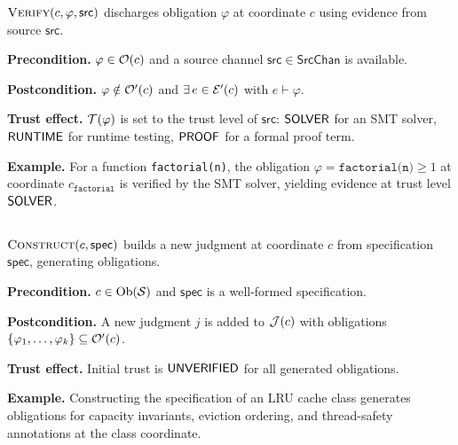 \documentclass[11pt]{article}
\newcommand{\SrcChan}{\mathsf{SrcChan}}
\begin{document}
\begin{definition}[\VERIFY]
$\textsc{Verify}(c, \varphi, \mathsf{src})$ discharges obligation $\varphi$
at coordinate $c$ using evidence from source $\mathsf{src}$.
\end{definition}

\noindent\textbf{Precondition.}
$\varphi \in \mathcal{O}(c)$ and a source channel $\mathsf{src} \in \SrcChan$
is available.

\noindent\textbf{Postcondition.}
$\varphi \notin \mathcal{O}'(c)$ and $\exists\, e \in \mathcal{E}'(c)$ with
$e \vdash \varphi$.

\noindent\textbf{Trust effect.}
$\mathcal{T}(\varphi)$ is set to the trust level of $\mathsf{src}$:
$\mathsf{SOLVER}$ for an SMT solver, $\mathsf{RUNTIME}$ for runtime testing,
$\mathsf{PROOF}$ for a formal proof term.

\noindent\textbf{Example.}
For a function \texttt{factorial(n)}, the obligation
$\varphi = \texttt{factorial(n)} \geq 1$ at coordinate $c_{\texttt{factorial}}$
is verified by the SMT solver, yielding evidence at trust level $\mathsf{SOLVER}$.

\subsection{\CONSTRUCT}\label{sec:move-construct}

\begin{definition}[\CONSTRUCT]
$\textsc{Construct}(c, \mathsf{spec})$ builds a new judgment at coordinate
$c$ from specification $\mathsf{spec}$, generating obligations.
\end{definition}

\noindent\textbf{Precondition.}
$c \in \mathrm{Ob}(\mathcal{S})$ and $\mathsf{spec}$ is a well-formed specification.

\noindent\textbf{Postcondition.}
A new judgment $j$ is added to $\mathcal{J}(c)$ with obligations
$\{\varphi_1, \ldots, \varphi_k\} \subseteq \mathcal{O}'(c)$.

\noindent\textbf{Trust effect.}
Initial trust is $\mathsf{UNVERIFIED}$ for all generated obligations.

\noindent\textbf{Example.}
Constructing the specification of an LRU cache class generates
obligations for capacity invariants, eviction ordering, and
thread-safety annotations at the class coordinate.

\subsection{\NORMALIZE}\label{sec:move-normalize}
\end{document}
